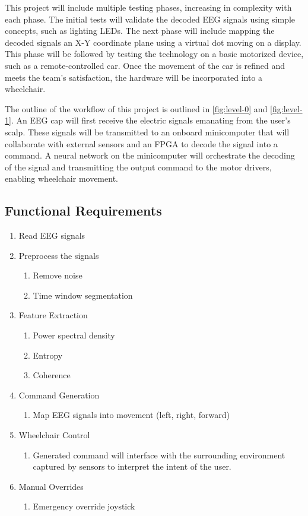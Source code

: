 \documentclass[conference]{IEEEtran}
\begin{document}
    This project will include multiple testing phases, increasing in complexity with each phase. The initial tests will validate the decoded EEG signals using simple concepts, such as lighting LEDs. The next phase will include mapping the decoded signals an X-Y coordinate plane using a virtual dot moving on a display. This phase will be followed by testing the technology on a basic motorized device, such as a remote-controlled car. Once the movement of the car is refined and meets the team's satisfaction, the hardware will be incorporated into a wheelchair.

    The outline of the workflow of this project is outlined in \ref{fig:level-0} and \ref{fig:level-1}. An EEG cap will first receive the electric signals emanating from the user's scalp. These signals will be transmitted to an onboard minicomputer that will collaborate with external sensors and an FPGA to decode the signal into a command. A neural network on the minicomputer will orchestrate the decoding of the signal and transmitting the output command to the motor drivers, enabling wheelchair movement. 

    \subsection{Functional Requirements}
    \begin{enumerate}
        \item Read EEG signals
        \item Preprocess the signals
        \begin{enumerate}
            \item Remove noise
            \item Time window segmentation
        \end{enumerate}
        \item Feature Extraction
        \begin{enumerate}
            \item Power spectral density
            \item Entropy
            \item Coherence
        \end{enumerate}
        \item Command Generation
        \begin{enumerate}
            \item Map EEG signals into movement (left, right, forward)
        \end{enumerate}
        \item Wheelchair Control
        \begin{enumerate}
            \item Generated command will interface with the surrounding environment captured by sensors to interpret the intent of the user.
        \end{enumerate}
        \item Manual Overrides
        \begin{enumerate}
            \item Emergency override joystick
        \end{enumerate}
    \end{enumerate}
\end{document}
